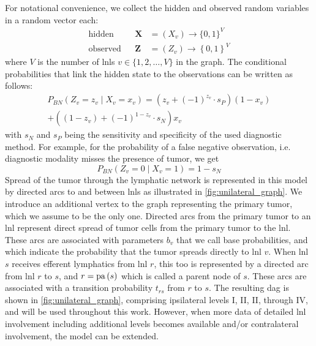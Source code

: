 \documentclass[\relativeRoot/main.tex]{subfiles}
\begin{document}
For notational convenience, we collect the hidden and observed random variables in a random vector each:
%
\begin{equation} \label{eq:bn:variables}
    \begin{aligned}
        \text{hidden}& & \mathbf{X} &= ( X_v ) \rightarrow \{ 0,1 \}^V \\
        \text{observed}& & \mathbf{Z} &= ( Z_v ) \rightarrow \left\{ 0, 1 \right\}^V
    \end{aligned}
\end{equation}
%
where $V$ is the number of \glspl{lnl} $v \in \{ 1,2,\ldots,V \}$ in the graph. The conditional probabilities that link the hidden state to the observations can be written as follows:
%
\begin{multline}
    P_{BN} \left( Z_v = z_v \mid X_v = x_v \right) = \left( z_v + (-1)^{z_v} \cdot s_P \right)(1 - x_v) \\ 
    + \left( (1 - z_v) + (-1)^{1 - z_v} \cdot s_N \right) x_v
\end{multline}
%
with $s_N$ and $s_P$ being the sensitivity and specificity of the used diagnostic method. For example, for the probability of a false negative observation, i.e. diagnostic modality misses the presence of tumor, we get
%
\begin{equation}
    P_{BN} \left( Z_v = 0 \mid X_v = 1 \right) = 1 - s_N
\end{equation}
%
Spread of the tumor through the lymphatic network is represented in this model by directed arcs to and between \glspl{lnl} as illustrated in \cref{fig:unilateral_graph}. We introduce an additional vertex to the graph representing the primary tumor, which we assume to be the only one. Directed arcs from the primary tumor to an \gls{lnl} represent direct spread of tumor cells from the primary tumor to the \gls{lnl}. These arcs are associated with parameters $b_v$ that we call base probabilities, and which indicate the probability that the tumor spreads directly to \gls{lnl} $v$. When \gls{lnl} $s$ receives efferent lymphatics from \gls{lnl} $r$, this too is represented by a directed arc from \gls{lnl} $r$ to $s$, and $r=\operatorname{pa}{(s)}$ which is called a parent node of $s$. These arcs are associated with a transition probability $t_{rs}$ from $r$ to $s$. The resulting \gls{dag} is shown in \cref{fig:unilateral_graph}, comprising ipsilateral levels I, II, II, through IV, and will be used throughout this work. However, when more data of detailed \gls{lnl} involvement including additional levels becomes available and/or contralateral involvement, the model can be extended.
\end{document}
